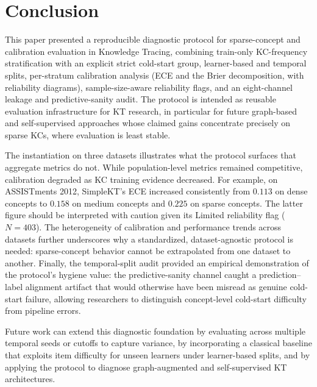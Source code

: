 \section{Conclusion}
\label{sec:conclusion}
This paper presented a reproducible diagnostic protocol for sparse-concept and calibration evaluation in Knowledge Tracing, combining train-only KC-frequency stratification with an explicit strict cold-start group, learner-based and temporal splits, per-stratum calibration analysis (ECE and the Brier decomposition, with reliability diagrams), sample-size-aware reliability flags, and an eight-channel leakage and predictive-sanity audit. The protocol is intended as reusable evaluation infrastructure for KT research, in particular for future graph-based and self-supervised approaches whose claimed gains concentrate precisely on sparse KCs, where evaluation is least stable.

The instantiation on three datasets illustrates what the protocol surfaces that aggregate metrics do not. While population-level metrics remained competitive, calibration degraded as KC training evidence decreased. For example, on ASSISTments 2012, SimpleKT's ECE increased consistently from $0.113$ on dense concepts to $0.158$ on medium concepts and $0.225$ on sparse concepts. The latter figure should be interpreted with caution given its Limited reliability flag ($N = 403$). The heterogeneity of calibration and performance trends across datasets further underscores why a standardized, dataset-agnostic protocol is needed: sparse-concept behavior cannot be extrapolated from one dataset to another. Finally, the temporal-split audit provided an empirical demonstration of the protocol's hygiene value: the predictive-sanity channel caught a prediction--label alignment artifact that would otherwise have been misread as genuine cold-start failure, allowing researchers to distinguish concept-level cold-start difficulty from pipeline errors.

Future work can extend this diagnostic foundation by evaluating across multiple temporal seeds or cutoffs to capture variance, by incorporating a classical baseline that exploits item difficulty for unseen learners under learner-based splits, and by applying the protocol to diagnose graph-augmented and self-supervised KT architectures.

